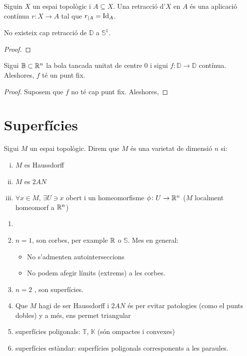 \begin{defi}
    Siguin $X$ un espai topològic i $A\subseteq X$. Una retracció d'$X$ en $A$ és una aplicació contínua $r\colon X \to A$ tal que $r_{|A}=\operatorname{Id}_A$.
\end{defi}

\begin{teo*}[No retracció]
    No existeix cap retracció de $\mathbb{D}$ a $\mathbb{S}^1$.
\end{teo*}

\begin{proof}

\end{proof}

\begin{teo*}
    Sigui $\mathbb{B}\subset \mathbb{R} ^n$ la bola tancada unitat de centre $0$ i sigui $f\colon \mathbb{D} \to \mathbb{D}$ contínua. Aleshores, $f$ té un punt fix.
\end{teo*}

\begin{proof}
    Suposem que $f$ no té cap punt fix. Aleshores,
\end{proof}
\section{Superfícies}

\begin{defi}[Varietat]
    Sigui $M$ un espai topològic. Direm que $M$ és una varietat de dimensió $n$ si:
    \begin{enumerate}[i)]
	\item $M$ es Haussdorff
	\item $M$ es $2AN$
	\item $\forall x \in M$, $\exists U \ni x$ obert i un homeomorfisme
	    $\phi \colon U \to \mathbb{R}^n$ ($M$ localment homeomorf a $\mathbb{R}^n$)
    \end{enumerate}
\end{defi}

\begin{example}
    \begin{enumerate}
	\item[]
	\item $n = 1$, son corbes, per example $\mathbb{R}$ o $\mathbb{S}$. Mes en general:
	    \begin{itemize}
		\item No s'admenten autointerseccions
		\item No podem afegir límits (extrems) a les corbes.
	    \end{itemize}
	\item $n = 2$ , son superfícies.
	\item Que $M$ hagi de ser Haussdorff i $2AN$ és per evitar patologies (como el punts
	    dobles) y a més, ens permet triangular
	\item superfícies poligonals: $\mathbb{T}$, $\mathbb{K}$ (són ompactes i convexes)
	\item superfícies estàndar: superfícies poligonals corresponents a les paraules.
    \end{enumerate}
\end{example}


